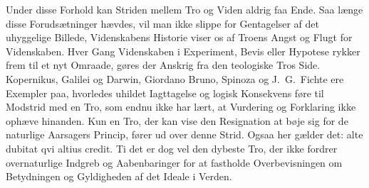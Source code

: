 \documentclass[12pt,a4paper]{article}
\begin{document}
Under disse Forhold kan Striden mellem Tro og Viden aldrig faa Ende.
Saa længe disse Forudsætninger hævdes, vil man ikke slippe for
Gentagelser af det uhyggelige Billede, Videnskabens Historie viser os af
Troens Angst og Flugt for Videnskaben. Hver Gang Videnskaben i
Experiment, Bevis eller Hypotese rykker frem til et nyt Omraade, gøres
der Anskrig fra den teologiske Tros Side. Kopernikus, Galilei og Darwin,
Giordano Bruno, Spinoza og J.\ G.\ Fichte ere Exempler paa, hvorledes
uhildet Iagttagelse og logisk Konsekvens føre til Modstrid med en Tro,
som endnu ikke har lært, at Vurdering og Forklaring ikke ophæve
hinanden. Kun en Tro, der kan vise den Resignation at bøje sig for de
naturlige Aarsagers Princip, fører ud over denne Strid. Ogsaa her
gælder det: alte dubitat qvi altius credit. Ti det er dog vel
den dybeste Tro, der ikke fordrer overnaturlige Indgreb og Aabenbaringer
for at fastholde Overbevisningen om Betydningen og Gyldigheden af det
Ideale i Verden.
\end{document}
